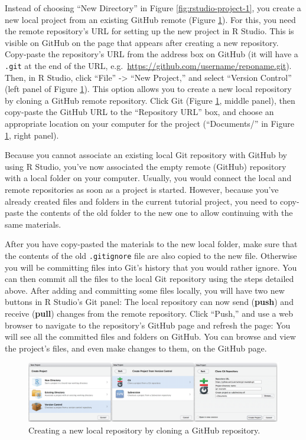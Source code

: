 \documentclass[
  american,
  ,doc,floatsintext]{apa6}
\begin{document}
Instead of choosing ``New Directory'' in Figure \ref{fig:rstudio-project-1}, you create a new local project from an existing GitHub remote (Figure \ref{fig:clone-from-github}). For this, you need the remote repository's URL for setting up the new project in R Studio. This is visible on GitHub on the page that appears after creating a new repository. Copy-paste the repository's URL from the address box on GitHub (it will have a \texttt{.git} at the end of the URL, e.g.~\url{https://github.com/username/reponame.git}). Then, in R Studio, click ``File'' -\textgreater{} ``New Project,'' and select ``Version Control'' (left panel of Figure \ref{fig:clone-from-github}). This option allows you to create a new local repository by cloning a GitHub remote repository. Click Git (Figure \ref{fig:clone-from-github}, middle panel), then copy-paste the GitHub URL to the ``Repository URL'' box, and choose an appropriate location on your computer for the project (``Documents/'' in Figure \ref{fig:clone-from-github}, right panel).

Because you cannot associate an existing local Git repository with GitHub by using R Studio, you've now associated the empty remote (GitHub) repository with a local folder on your computer. Usually, you would connect the local and remote repositories as soon as a project is started. However, because you've already created files and folders in the current tutorial project, you need to copy-paste the contents of the old folder to the new one to allow continuing with the same materials.

After you have copy-pasted the materials to the new local folder, make sure that the contents of the old \texttt{.gitignore} file are also copied to the new file. Otherwise you will be committing files into Git's history that you would rather ignore. You can then commit all the files to the local Git repository using the steps detailed above. After adding and committing some files locally, you will have two new buttons in R Studio's Git panel: The local repository can now send (\textbf{push}) and receive (\textbf{pull}) changes from the remote repository. Click ``Push,'' and use a web browser to navigate to the repository's GitHub page and refresh the page: You will see all the committed files and folders on GitHub. You can browse and view the project's files, and even make changes to them, on the GitHub page.

\begin{figure}

{\centering \includegraphics[width=6in]{images/rstudio-git-clone} 

}

\caption{Creating a new local repository by cloning a GitHub repository.}\label{fig:clone-from-github}
\end{figure}
\end{document}
